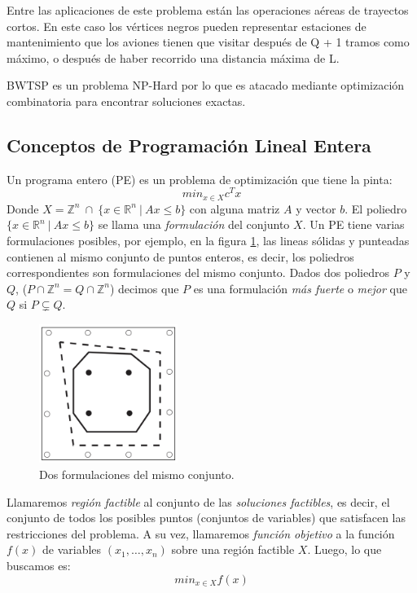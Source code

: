 \documentclass[10pt, a4paper]{article}
\theoremstyle{definition}
\begin{document}
Entre las aplicaciones de este problema están las operaciones aéreas de trayectos cortos. En este caso los vértices negros pueden representar estaciones de mantenimiento que los aviones tienen que visitar después de Q + 1 tramos como máximo, o después de haber recorrido una distancia máxima de L.

BWTSP es un problema NP-Hard por lo que es atacado mediante optimización combinatoria para encontrar soluciones exactas.

\subsection{Conceptos de Programación Lineal Entera}

Un programa entero (PE) es un problema de optimización que tiene la pinta:
$$min_{x \in X} c^Tx$$
Donde $X = \mathds{Z}^n\ \cap\ \{x \in \mathds{R}^n\ |\ Ax \leq b \}$ con alguna matriz $A$ y vector $b$. El poliedro $\{x \in \mathds{R}^n\ |\ Ax \leq b \}$ se llama una \textit{formulación} del conjunto $X$.
Un PE tiene varias formulaciones posibles, por ejemplo, en la figura \ref{fig:ejemplo_formulaciones}, las lineas sólidas y punteadas contienen al mismo conjunto de puntos enteros, es decir, los poliedros correspondientes son formulaciones del mismo conjunto.
Dados dos poliedros $P$ y $Q$, ($P \cap \mathds{Z}^n = Q \cap \mathds{Z}^n$) decimos que $P$ es una formulación \textit{más fuerte} o \textit{mejor} que $Q$ si $P \subsetneq Q$.

\begin{figure}[H]
  \centering
  \includegraphics[width=0.4\textwidth]{ejemplo_formulaciones.png}
  \caption{Dos formulaciones del mismo conjunto.}
  \label{fig:ejemplo_formulaciones}
\end{figure}

Llamaremos \textit{región factible} al conjunto de las \textit{soluciones factibles}, es decir, el conjunto de todos los posibles puntos (conjuntos de variables) que satisfacen las restricciones del problema. A su vez, llamaremos \textit{función objetivo} a la función $f(x)$ de variables $(x_1,\dots,x_n)$ sobre una región factible $X$. Luego, lo que buscamos es:
$$min_{x \in X} f(x)$$
\end{document}
